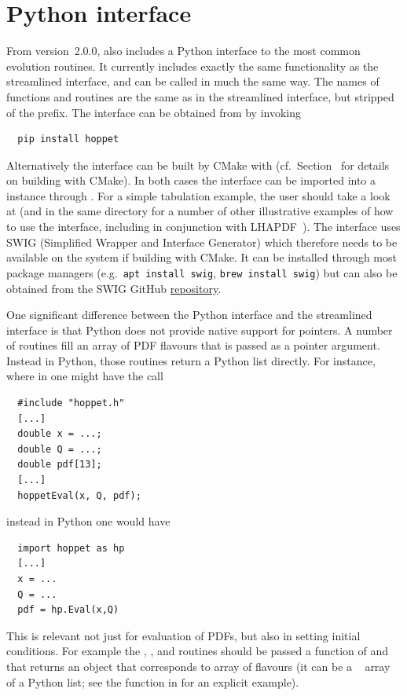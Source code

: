 \section{Python interface}
\label{sec:pyinterface}
From version~2.0.0, \hoppet also includes a Python interface to the
most common evolution routines. It currently includes exactly the same
functionality as the streamlined interface, and can be called in much
the same way. The names of functions and routines are the same as in
the streamlined interface, but stripped of the 
prefix. The interface can be obtained from  by invoking
\begin{lstlisting}
  pip install hoppet
\end{lstlisting}
Alternatively the interface can be built by CMake with
 (cf.\ Section~
for details on building with CMake). In both cases the interface
can be imported into a  instance through .
%
For a simple tabulation example, the user should take a look
at
(and in the same directory for a number of other illustrative examples
of how to use the interface, including in conjunction with
LHAPDF~\cite{LHAPDF}). The interface uses SWIG (Simplified Wrapper and
Interface Generator) which therefore needs to be available on the
system if building with CMake. It can be installed through most
package managers (e.g.\ \texttt{apt install swig}, \texttt{brew
  install swig}) but can also be obtained from the SWIG GitHub
\href{https://github.com/swig}{repository}.

One significant difference between the Python interface and the
streamlined interface is that Python does not provide native support
for pointers.
%
A number of \CPP routines
fill an array of PDF flavours that is passed as a pointer
argument.
%
Instead in Python, those routines return a
Python list directly.
%
For instance, where in \CPP{}
one might have the call
%
\begin{lstlisting}
  #include "hoppet.h"
  [...]
  double x = ...;
  double Q = ...;
  double pdf[13];
  [...]
  hoppetEval(x, Q, pdf);
\end{lstlisting}
%
instead in Python one would have
%
\begin{lstlisting}
  import hoppet as hp
  [...]
  x = ...
  Q = ...
  pdf = hp.Eval(x,Q)
\end{lstlisting}
This is relevant not just for evaluation of PDFs, but also in setting
initial conditions. 
%
For example the , , and
 routines should be passed a function
of 
 and  that returns an object that corresponds to array
of flavours (it can be a ~\cite{Harris:2020xlr} array of a
Python list; see the  function in
for an explicit example).

